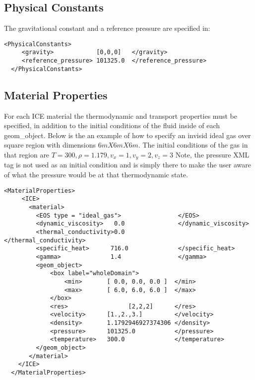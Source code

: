 \subsection{Physical Constants}
The gravitational constant and a reference pressure are specified in:
\begin{Verbatim}[fontsize=\footnotesize]
  <PhysicalConstants>
     <gravity>            [0,0,0]   </gravity>
     <reference_pressure> 101325.0  </reference_pressure>
  </PhysicalConstants>
\end{Verbatim}
%
\subsection{Material Properties} \label{sec:ICEmat_props}
For each ICE material the thermodynamic and transport properties must be specified, in addition to the initial conditions of the fluid inside of each geom\_object.  Below is the an example of how to specify an invisid ideal gas over square region with dimensions $6m X 6m X 6m$.  The initial conditions of the gas in that region are $T=300, \rho=1.179, v_x=1,v_y=2, v_z=3$ \big{(}Note, the pressure XML tag is not used as an initial condition and is simply there to make the user aware of what the pressure would be at that thermodynamic state.\big{)}
%
\begin{Verbatim}[fontsize=\footnotesize]
  <MaterialProperties>
     <ICE>
       <material>
         <EOS type = "ideal_gas">                </EOS>
         <dynamic_viscosity>   0.0               </dynamic_viscosity>
         <thermal_conductivity>0.0               </thermal_conductivity>
         <specific_heat>      716.0              </specific_heat>
         <gamma>              1.4                </gamma>
         <geom_object>
             <box label="wholeDomain">
                 <min>       [ 0.0, 0.0, 0.0 ]  </min>
                 <max>       [ 6.0, 6.0, 6.0 ]  </max>
             </box>
             <res>                 [2,2,2]      </res>
             <velocity>      [1.,2.,3.]         </velocity>
             <density>       1.1792946927374306 </density>
             <pressure>      101325.0           </pressure>     
             <temperature>   300.0              </temperature>
         </geom_object>
       </material>
    </ICE>       
  </MaterialProperties>
\end{Verbatim}
